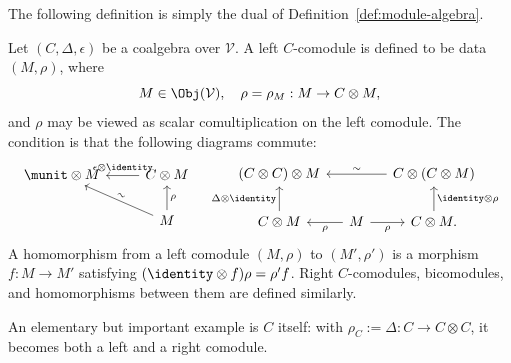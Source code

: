 The following definition is simply the dual of
Definition~\ref{def:module-algebra}.

\begin{definition}[Comodule]\label{def:comodule-cogebra}
	Let $(C,\Delta,\epsilon)$ be a coalgebra over $\mathcal{V}$. A left
	$C$-comodule is defined to be data $(M,\rho)$, where
	\[ M \in \Obj(\mathcal{V}), \quad \rho = \rho_M : M \to C \otimes M, \]
	and $\rho$ may be viewed as scalar comultiplication on the left comodule.
	The condition is that the following diagrams commute:
	\[\begin{tikzcd}
		\munit \otimes M & C \otimes M \arrow[l, "{\epsilon \otimes \identity}"'] \\
		& M \arrow[u, "{\rho}"'] \arrow[lu, "\sim" sloped]
	\end{tikzcd} \quad \begin{tikzcd}[column sep=small]
		(C \otimes C) \otimes M & & C \otimes (C \otimes M) \arrow[ll, "\sim"'] \\
		C \otimes M \arrow[u, "{\Delta \otimes \identity}"] & M \arrow[l, "{\rho}"] \arrow[r, "{\rho}"'] & C \otimes M. \arrow[u, "{\identity \otimes \rho}"']
	\end{tikzcd}\]
	A homomorphism from a left comodule $(M,\rho)$ to $(M',\rho')$ is a
	morphism $f:M\to M'$ satisfying
	$(\identity\otimes f)\rho=\rho'f$. Right $C$-comodules, bicomodules, and
	homomorphisms between them are defined similarly.
\end{definition}

An elementary but important example is $C$ itself: with
$\rho_C:=\Delta:C\to C\otimes C$, it becomes both a left and a right
comodule.


